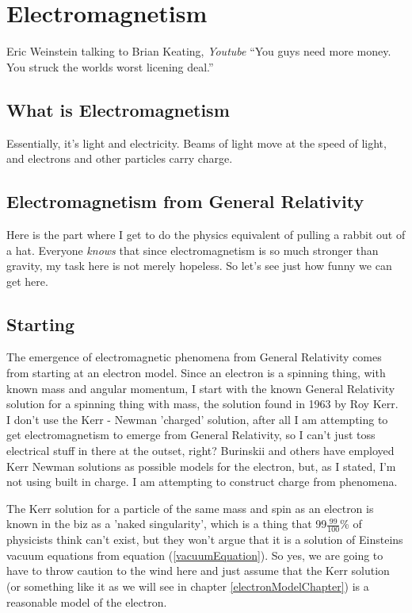 \documentclass[../rzero]{subfiles}
\begin{document}
\chapter{Electromagnetism}\label{electromagnetismChapter}

\begin{chapquote}{Eric Weinstein talking to Brian Keating, \textit{Youtube\cite{drbriankeatingEricWeinsteinTheoretical2020}}}
``You guys need more money. You struck the worlds worst licening deal.''
\end{chapquote}


\section{What is Electromagnetism}
Essentially, it's light and electricity. Beams of light move at the speed of light, and electrons and other particles carry charge. 

\section{Electromagnetism from General Relativity}
Here is the part where I get to do the physics equivalent of pulling a rabbit out of a hat. Everyone \textit{knows} that since electromagnetism is so much stronger than gravity, my task here is not merely hopeless. So let's see just how funny we can get here. 



\section{Starting}
The emergence of electromagnetic phenomena from General Relativity comes from starting at an electron model. Since an electron is a spinning thing, with known mass and angular momentum, I start with the known General Relativity solution for a spinning thing with mass, the  solution found in 1963 by Roy Kerr\cite{kerrGravitationalFieldSpinning1963}. I don't use the Kerr - Newman 'charged' solution\cite{newmanNoteKerrSpinningParticle1965}, after all I am attempting to get electromagnetism to emerge from General Relativity, so I can't just toss electrical stuff in there at the outset, right? Burinskii\cite{Burinskii2008} and others have employed Kerr Newman solutions as possible models for the electron, but, as I stated, I'm not using built in charge. I am attempting to construct charge from phenomena.

The Kerr solution for a particle of the same mass and spin as an electron is known in the biz as a 'naked singularity', which is a thing that 99$\frac{99}{100}$\% of physicists think can't exist, but they won't argue that it is a solution of Einsteins vacuum equations from equation (\ref{vacuumEquation}). So yes, we are going to have to throw caution to the wind here and just assume that the Kerr solution (or something like it as we will see in chapter \ref{electronModelChapter}) is a reasonable model of the electron. 
\end{document}
